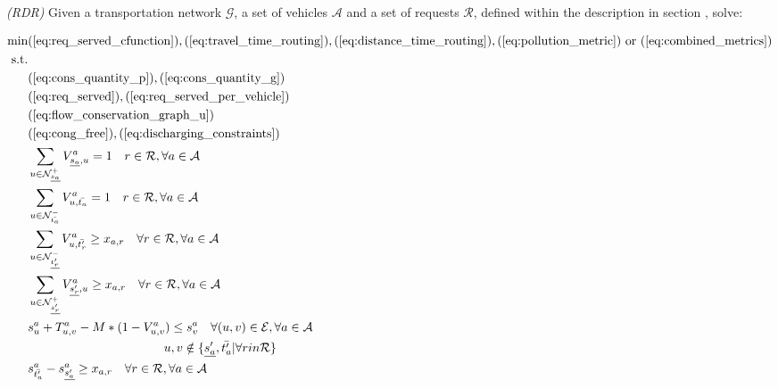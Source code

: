 \begin{algori}{\textit{(RDR)}}
	Given a transportation network $\mathcal{G}$, a set of vehicles $\mathcal{A}$ and a set of requests $\mathcal{R}$, defined within the description in section , solve:
	\label{RDR}
\end{algori}

\begin{align}
	\text{min}&  
		(\ref{eq:req_served_cfunction}),
		(\ref{eq:travel_time_routing}), (\ref{eq:distance_time_routing}), (\ref{eq:pollution_metric}) \text{ or } (\ref{eq:combined_metrics})
	\nonumber\\
	\text{s.t.} &\nonumber\\
	&(\ref{eq:cons_quantity_p}),(\ref{eq:cons_quantity_g})\nonumber\\	
	&(\ref{eq:req_served}),(\ref{eq:req_served_per_vehicle})\nonumber\\	
	&(\ref{eq:flow_conservation_graph_u})\nonumber\\%
	&(\ref{eq:cong_free}),(\ref{eq:discharging_constraints})\nonumber\\
	&\sum_{ u \in \mathcal{N}^+_{\underline{s_a}} }V^a_{ \underline{s_a},u} = 1 \quad r \in \mathcal{R},  \forall a \in \mathcal{A} \label{eq:flow_cons_arrival_graph_u_d}\\
	&\sum_{u \in \mathcal{N}^-_{\bar{t_a}} } V^a_{u, \bar{t_a}} = 1 \quad r \in \mathcal{R},  \forall a \in \mathcal{A} \label{eq:flow_cons_departure_graph_u_d}\\
	&\sum_{u \in \mathcal{N}^-_{\underline{t'_r}} } V^a_{u, \bar{t'_r}} \ge x_{a,r} \quad  \forall r \in \mathcal{R}, \forall a \in \mathcal{A} \label{eq:must_arrive_dep}	\\
	&\sum_{u \in \mathcal{N}^+_{\underline{s'_r}} } V^a_{ \underline{s'_r}, u} \ge x_{a,r} \quad   \forall r \in \mathcal{R}, \forall a \in \mathcal{A}\label{eq:must_go_start}\\
	&s_{u}^a + T_{u,v}^a - M*(1-V^a_{u,v}) \leq s_{v}^a  \quad \forall (u,v) \in \mathcal{E},  \forall a \in \mathcal{A}\label{eq:relations_node_time_2}\\
	 &\quad \quad \quad\quad \quad \quad \quad \quad \quad \quad \quad u,v \notin \{\underline{s'_a},\bar{t'_a} | \forall r in \mathcal{R}\}\nonumber\\
	 &s_{\bar{t'_a} }^a - s_{\underline{s'_a} }^a \ge x_{a,r}  \quad \forall r \in \mathcal{R}, \forall a \in \mathcal{A} \label{eq:req_order}
\end{align}
